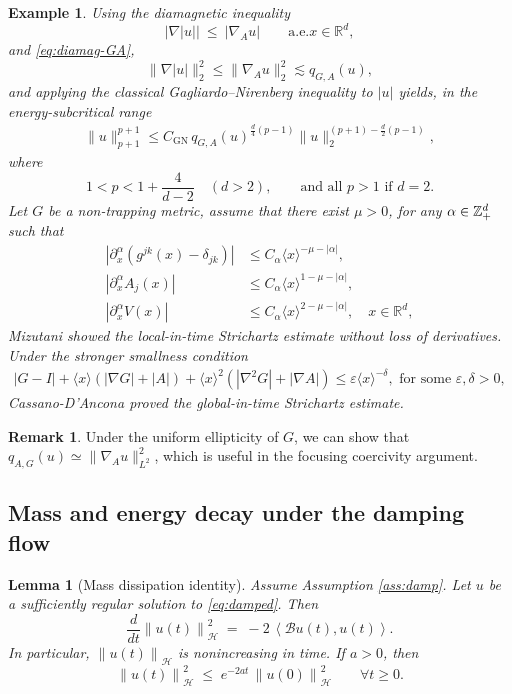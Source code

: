 \documentclass[10pt%
]{amsart}
\numberwithin{equation}{section}
\newtheorem{example}{Example}[section]
\newcommand{\norm}[1]{\left\|#1\right\|}
\newcommand{\R}{\mathbb{R}}
\newcommand{\ip}[2]{\left\langle #1,#2\right\rangle}
\newtheorem{lemma}[theorem]{Lemma}
\theoremstyle{definition}
\newtheorem{remark}[theorem]{Remark}
\begin{document}
\begin{example}
Using the diamagnetic inequality
\begin{equation}\label{eq:diamag-GA}
	|\nabla |u||\ \le\ |\nabla_{ A}u|\qquad \text{a.e.}x\in\R^d,
\end{equation}
and \eqref{eq:diamag-GA},
\[
\|\nabla |u|\|_2^2 \le \|\nabla_{ A}u\|_2^2 \lesssim q_{G, A}(u),
\]
and applying the classical Gagliardo--Nirenberg inequality to $|u|$ yields, in the energy-subcritical range
\begin{align*}
	\|u\|_{p+1}^{p+1}
	\leq
	C_{\mathrm{GN}}\,
	q_{G,A}(u)^{\frac{d}{4}(p-1)}\|u\|_2^{(p+1)-\frac{d}{2}(p-1)},
\end{align*}
where
\[
1<p<1+\frac{4}{d-2}\quad(d>2),\qquad \text{and all }p>1\text{ if }d= 2.
\]
		Let $G$ be a non-trapping metric, assume that there exist $\mu>0$, for any $\alpha\in \Bbb Z_+^d$ such that \begin{align*}
    |\partial_x^\alpha (g^{jk}(x) - \delta_{jk})| &\leq C_\alpha \langle x \rangle^{-\mu - |\alpha|}, \\
    |\partial_x^\alpha A_j(x)| &\leq C_\alpha \langle x \rangle^{1 - \mu - |\alpha|}, \\
    |\partial_x^\alpha V(x)| &\leq C_\alpha \langle x \rangle^{2 - \mu - |\alpha|}, \quad x \in \mathbb{R}^d,
\end{align*} Mizutani \cite{Miz13} showed the local-in-time Strichartz estimate without loss of derivatives. Under the stronger smallness condition
\begin{align*}
  |G-I|+\langle x\rangle(|\nabla G|+|A|)+\langle x\rangle^2(|\nabla^2G|+|\nabla A|)\leq \varepsilon\langle x\rangle^{-\delta},\,\,\mbox{for some }\varepsilon,\delta>0,
\end{align*}
Cassano-D'Ancona \cite{CD16} proved the global-in-time Strichartz estimate.

	\end{example}
	\begin{remark}
		Under the uniform ellipticity of $G$,  we can show that $q_{A,G}(u)\simeq \|\nabla_Au\|_{L^2}^2$, which is useful in the focusing coercivity argument.
	\end{remark}

\subsection{Mass and energy decay under the damping flow}
\begin{lemma}[Mass dissipation identity]\label{lem:mass}
	Assume Assumption \ref{ass:damp}. Let $u$ be a sufficiently regular solution to \eqref{eq:damped}. Then
	\begin{equation}\label{eq:mass-id}
		\frac{d}{dt}\norm{u(t)}_{\mathcal H}^2 \;=\; -2\,\ip{\mathcal B u(t)}{u(t)}.
	\end{equation}
	In particular, $\norm{u(t)}_{\mathcal H}$ is nonincreasing in time.
	If  $a>0$, then
	\begin{equation}\label{eq:mass-exp}
		\norm{u(t)}_{\mathcal H}^2 \;\le\; e^{-2at}\,\norm{u(0)}_{\mathcal H}^2
		\qquad \forall t\ge 0.
	\end{equation}
\end{lemma}
\end{document}
